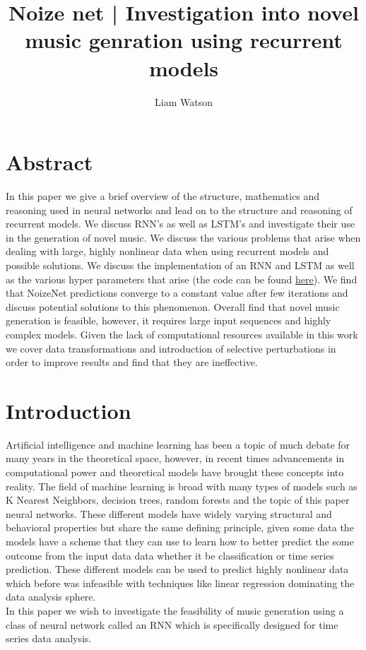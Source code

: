 \documentclass{article}
\title{Noize net | Investigation into novel music genration using recurrent models}
\author{Liam Watson}
\begin{document}
\maketitle
\tableofcontents
\section{Abstract}
In this paper we give a brief overview of the structure, mathematics and reasoning used in neural networks and lead on to the structure and reasoning of recurrent models. We discuss RNN's as well as LSTM's and investigate their use in the generation of novel music. We discuss the various problems that arise when dealing with large, highly nonlinear data when using recurrent models and possible solutions. We discuss the implementation of an RNN and LSTM as well as the various hyper parameters that arise (the code can be found \href{https://github.com/Liam-Watson/NoizeNet/blob/main/code/FinalNoteBook.ipynb}{here}). We find that NoizeNet predictions converge to a constant value after few iterations and discuss potential solutions to this phenomenon. Overall find that novel music generation is feasible, however, it requires large input sequences and highly complex models. Given the lack of computational resources available in this work we cover data transformations and introduction of selective perturbations in order to improve results and find that they are ineffective.
\section{Introduction}
Artificial intelligence and machine learning has been a topic of much debate for many years in the theoretical space, however, in recent times advancements in computational power and theoretical models have brought these concepts into reality. The field of machine learning is broad with many types of models such as K Nearest Neighbors, decision trees, random forests and the topic of this paper neural networks. These different models have widely varying structural and behavioral properties but share the same defining principle, given some data the models have a scheme that they can use to learn how to better predict the some outcome from the input data data whether it be classification or time series prediction. These different models can be used to predict highly nonlinear data which before was infeasible with techniques like linear regression dominating the data analysis sphere. \\
In this paper we wish to investigate the feasibility of music generation using a class of neural network called an RNN which is specifically designed for time series data analysis.  
\end{document}
